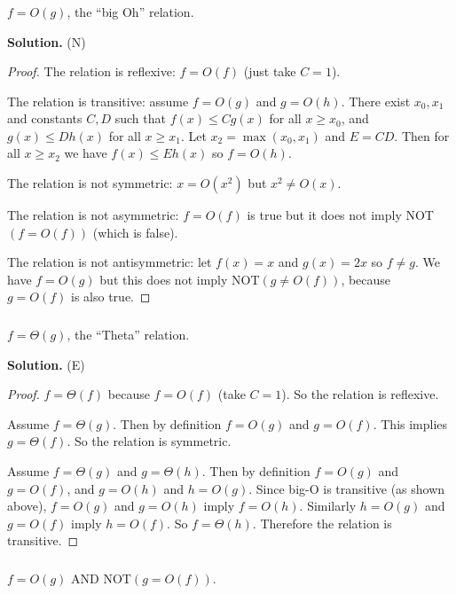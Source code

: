 \documentclass[14pt]{extarticle}
\begin{document}
\subsubsection{}
$f = O(g)$, the ``big Oh'' relation.

{\bf Solution.} (N)

\begin{proof}
The relation is reflexive: $f = O(f)$ (just take $C = 1$).

The relation is transitive: assume $f = O(g)$ and $g = O(h)$. There exist $x_0, x_1$ and constants $C, D$ such that $f(x) \leq Cg(x)$ for all $x \geq x_0$, and $g(x) \leq Dh(x)$ for all $x \geq x_1$. Let $x_2 = \max(x_0, x_1)$ and $E = CD$. Then for all $x \geq x_2$ we have $f(x) \leq Eh(x)$ so $f = O(h)$.

The relation is not symmetric: $x = O(x^2)$ but $x^2 \neq O(x)$.

The relation is not asymmetric: $f = O(f)$ is true but it does not imply NOT$(f = O(f))$ (which is false).

The relation is not antisymmetric: let $f(x) = x$ and $g(x) = 2x$ so $f \neq g$. We have $f = O(g)$ but this does not imply NOT$(g \neq O(f))$, because $g = O(f)$ is also true.
\end{proof}

\subsubsection{}
$f = \Theta(g)$, the ``Theta'' relation.

{\bf Solution.} (E)

\begin{proof}
$f = \Theta(f)$ because $f = O(f)$ (take $C = 1$). So the relation is reflexive.

Assume $f = \Theta(g)$. Then by definition $f = O(g)$ and $g = O(f)$. This implies $g = \Theta(f)$. So the relation is symmetric.

Assume $f = \Theta(g)$ and $g = \Theta(h)$. Then by definition $f = O(g)$ and $g = O(f)$, and $g = O(h)$ and $h = O(g)$. Since big-O is transitive (as shown above), $f = O(g)$ and $g = O(h)$ imply $f = O(h)$. Similarly $h = O(g)$ and $g = O(f)$ imply $h = O(f)$. So $f = \Theta(h)$. Therefore the relation is transitive.
\end{proof}

\subsubsection{}
$f = O(g)$ AND NOT$(g = O(f))$.
\end{document}
